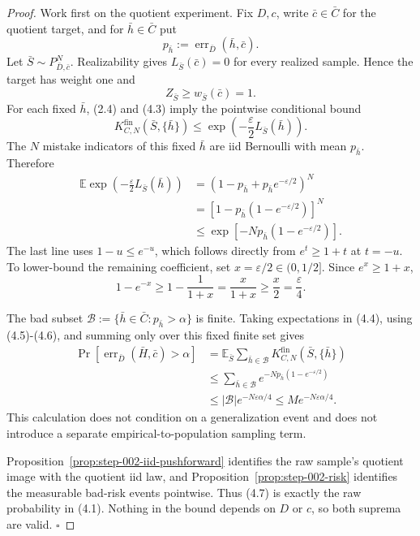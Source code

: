 \begin{proof}
Work first on the quotient experiment. Fix \(D,c\), write
\(\bar c\in\bar C\) for the quotient target, and for
\(\bar h\in\bar C\) put
\[
p_{\bar h}:=
\operatorname{err}_{\bar D}(\bar h,\bar c).
\tag{4.2}
\]
Let \(\bar S\sim P_{\bar D,\bar c}^N\). Realizability gives
\(L_{\bar S}(\bar c)=0\) for every realized sample. Hence the target has
weight one and
\[
Z_{\bar S}\ge w_{\bar S}(\bar c)=1.
\tag{4.3}
\]
For each fixed \(\bar h\), (2.4) and (4.3) imply the pointwise conditional
bound
\[
K^{\mathrm{fin}}_{C,N}(\bar S,\{\bar h\})
\le \exp\!\left(-\frac\varepsilon2L_{\bar S}(\bar h)\right).
\tag{4.4}
\]
The \(N\) mistake indicators of this fixed \(\bar h\) are iid Bernoulli
with mean \(p_{\bar h}\). Therefore
\[
\begin{aligned}
\mathbb E\exp\!\left(-\frac\varepsilon2L_{\bar S}(\bar h)\right)
&=\left(1-p_{\bar h}+p_{\bar h}e^{-\varepsilon/2}\right)^N\\
&=\left[1-p_{\bar h}(1-e^{-\varepsilon/2})\right]^N\\
&\le
\exp\!\left[-Np_{\bar h}(1-e^{-\varepsilon/2})\right].
\end{aligned}
\tag{4.5}
\]
The last line uses \(1-u\le e^{-u}\), which follows directly from
\(e^t\ge1+t\) at \(t=-u\). To lower-bound the remaining coefficient, set
\(x=\varepsilon/2\in(0,1/2]\). Since \(e^x\ge1+x\),
\[
1-e^{-x}\ge1-\frac1{1+x}=\frac{x}{1+x}
\ge\frac x2=\frac\varepsilon4.
\tag{4.6}
\]

The bad subset
\(\mathcal B:=\{\bar h\in\bar C:p_{\bar h}>\alpha\}\) is finite. Taking
expectations in (4.4), using (4.5)-(4.6), and summing only over this fixed
finite set gives
\[
\begin{aligned}
\Pr[\operatorname{err}_{\bar D}(\bar H,\bar c)>\alpha]
&=\mathbb E_{\bar S}
\sum_{\bar h\in\mathcal B}
K^{\mathrm{fin}}_{C,N}(\bar S,\{\bar h\})\\
&\le\sum_{\bar h\in\mathcal B}
e^{-Np_{\bar h}(1-e^{-\varepsilon/2})}\\
&\le |\mathcal B|e^{-N\varepsilon\alpha/4}
\le Me^{-N\varepsilon\alpha/4}.
\end{aligned}
\tag{4.7}
\]
This calculation does not condition on a generalization event and does not
introduce a separate empirical-to-population sampling term.

Proposition~\ref{prop:step-002-iid-pushforward} identifies the raw
sample's quotient image with the quotient iid law, and Proposition~\ref{prop:step-002-risk} identifies the measurable bad-risk
events pointwise. Thus (4.7) is exactly the raw probability in (4.1).
Nothing in the bound depends on \(D\) or \(c\), so both suprema are valid.
\(\square\)


\end{proof}

